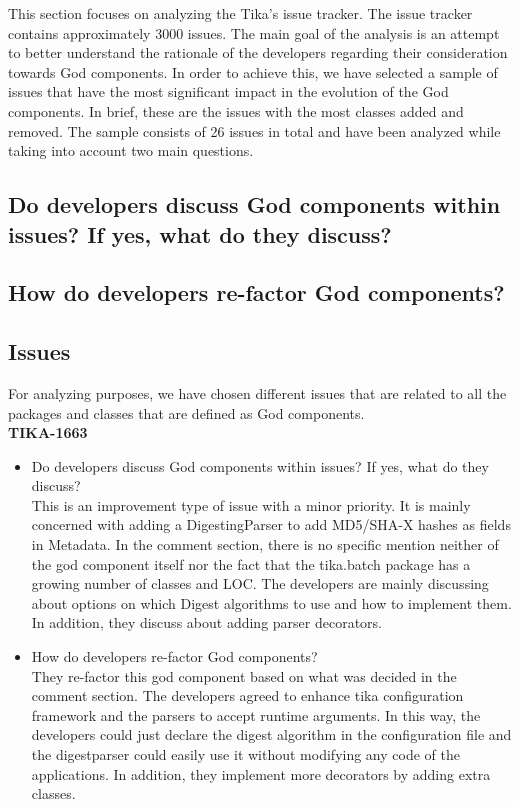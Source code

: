 \documentclass{article}
\begin{document}
This section focuses on analyzing the Tika’s issue tracker. The issue tracker contains approximately 3000 issues. The main goal of the analysis is an attempt to better understand the rationale of the developers regarding their consideration towards God components. In order to achieve this, we have selected a sample of issues that have the most significant impact in the evolution of the God components. In brief, these are the issues with the most classes added and removed.  The sample consists of 26 issues in total and have been analyzed while taking into account two main questions.
\subsection{Do developers discuss God components within issues? If yes, what do they discuss?}
\subsection{ How do developers re-factor God components?}



\subsection{Issues}
For analyzing purposes, we have chosen different issues that are related to all the packages and classes that are defined as God components. \\
\textbf{TIKA-1663}
\begin{itemize}
    \item Do developers discuss God components within issues? If yes, what do they discuss?\\
    This is an improvement type of issue with a minor priority. It is mainly concerned with adding a DigestingParser to add MD5/SHA-X hashes as fields in Metadata. In the comment section, there is no specific mention neither of the god component itself nor the fact that the tika.batch package has a growing number of classes and LOC. The developers are mainly discussing about options on which Digest algorithms to use and how to implement them.  In addition, they discuss about adding parser decorators.
    \item How do developers re-factor God components?\\
    They re-factor this god component based on what was decided in the comment section. The developers agreed to enhance tika configuration framework and the parsers to accept runtime arguments. In this way, the developers could just declare the digest algorithm in the configuration file and the digestparser could easily use it without modifying any code of the applications. In addition, they implement more decorators by adding extra classes.
\end{itemize}
\end{document}

